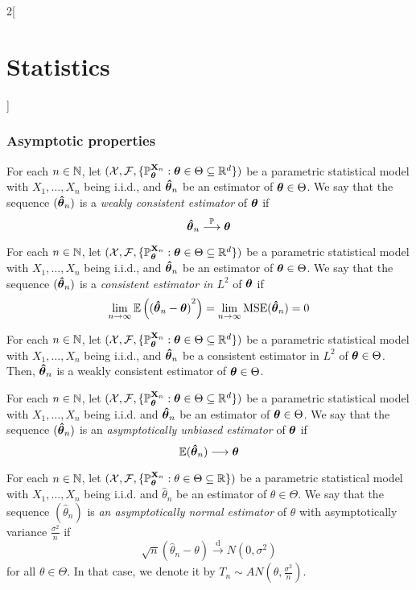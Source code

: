 \documentclass[../../../main.tex]{subfiles}
\begin{document}
\begin{multicols}{2}[\section{Statistics}]
  \subsubsection{Asymptotic properties}
  \begin{definition}
    For each $n\in\mathbb{N}$, let $(\mathcal{X},\mathcal{F},\{\mathbb{P}_{\boldsymbol{\mathrm{\theta}}}^{\boldsymbol{\mathrm{X}}_n}:\boldsymbol{\mathrm{\theta}}\in\Theta\subseteq \mathbb{R}^d\})$ be a parametric statistical model with $X_1,\ldots,X_n$ being i.i.d., and ${\boldsymbol{\mathrm{\hat\theta}}}_n$ be an estimator of $\boldsymbol{\mathrm{\theta}}\in\Theta$. We say that the sequence $({\boldsymbol{\mathrm{\hat\theta}}}_n)$ is a \emph{weakly consistent estimator} of $\boldsymbol{\mathrm{\theta}}$ if $${\boldsymbol{\mathrm{\hat\theta}}}_n\overset{\mathbb{P}}{\longrightarrow}\boldsymbol{\mathrm{\theta}}$$
  \end{definition}
  \begin{definition}
    For each $n\in\mathbb{N}$, let $(\mathcal{X},\mathcal{F},\{\mathbb{P}_{\boldsymbol{\mathrm{\theta}}}^{\boldsymbol{\mathrm{X}}_n}:\boldsymbol{\mathrm{\theta}}\in\Theta\subseteq \mathbb{R}^d\})$ be a parametric statistical model with $X_1,\ldots,X_n$ being i.i.d., and ${\boldsymbol{\mathrm{\hat\theta}}}_n$ be an estimator of $\boldsymbol{\mathrm{\theta}}\in\Theta$. We say that the sequence $({\boldsymbol{\mathrm{\hat\theta}}}_n)$ is a \emph{consistent estimator in $L^2$} of $\boldsymbol{\mathrm{\theta}}$ if $$\lim_{n\to\infty}\mathbb{E}\left({(\boldsymbol{\mathrm{\hat\theta}}_n-\boldsymbol{\mathrm{\theta}})}^2\right)=\lim_{n\to\infty}\operatorname{MSE}(\boldsymbol{\mathrm{\hat\theta}}_n)=0$$
  \end{definition}
  \begin{proposition}
    For each $n\in\mathbb{N}$, let $(\mathcal{X},\mathcal{F},\{\mathbb{P}_{\boldsymbol{\mathrm{\theta}}}^{\boldsymbol{\mathrm{X}}_n}:\boldsymbol{\mathrm{\theta}}\in\Theta\subseteq \mathbb{R}^d\})$ be a parametric statistical model with $X_1,\ldots,X_n$ being i.i.d., and ${\boldsymbol{\mathrm{\hat\theta}}}_n$ be a consistent estimator in $L^2$ of $\boldsymbol{\mathrm{\theta}}\in\Theta$. Then, ${\boldsymbol{\mathrm{\hat\theta}}}_n$ is a weakly consistent estimator of $\boldsymbol{\mathrm{\theta}}\in\Theta$.
  \end{proposition}
  \begin{definition}
    For each $n\in\mathbb{N}$, let $(\mathcal{X},\mathcal{F},\{\mathbb{P}_{\boldsymbol{\mathrm{\theta}}}^{\boldsymbol{\mathrm{X}}_n}:\boldsymbol{\mathrm{\theta}}\in\Theta\subseteq \mathbb{R}^d\})$ be a parametric statistical model with $X_1,\ldots,X_n$ being i.i.d. and ${\boldsymbol{\mathrm{\hat\theta}}}_n$ be an estimator of $\boldsymbol{\mathrm{\theta}}\in\Theta$. We say that the sequence $({\boldsymbol{\mathrm{\hat\theta}}}_n)$ is an \emph{asymptotically unbiased estimator} of $\boldsymbol{\mathrm{\theta}}$ if $$\mathbb{E}({\boldsymbol{\mathrm{\hat\theta}}}_n)\longrightarrow\boldsymbol{\mathrm{\theta}}$$
  \end{definition}
  \begin{definition}
    For each $n\in\mathbb{N}$, let $(\mathcal{X},\mathcal{F},\{\mathbb{P}_{\boldsymbol{\mathrm{\theta}}}^{\boldsymbol{\mathrm{X}}_n}:\theta\in\Theta\subseteq \mathbb{R}\})$ be a parametric statistical model with $X_1,\ldots,X_n$ being i.i.d. and ${\hat\theta}_n$ be an estimator of $\theta\in\Theta$. We say that the sequence $({\hat\theta}_n)$ is \emph{an asymptotically normal estimator} of $\theta$ with asymptotically variance $\frac{\sigma^2}{n}$ if $$\sqrt{n}({\hat\theta}_n-\theta)\overset{\text{d}}{\longrightarrow}N(0,\sigma^2)$$
    for all $\theta\in\Theta$. In that case, we denote it by $T_n\sim AN\left(\theta,\frac{\sigma^2}{n}\right)$.
  \end{definition}

\end{multicols}
\end{document}
